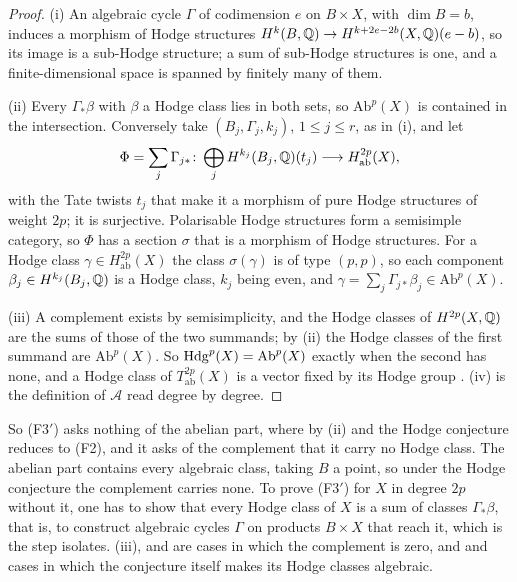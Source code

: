 \begin{proof}
(i) An algebraic cycle $\Gamma$ of codimension $e$ on $B\times X$, with
$\dim B=b$, induces a morphism of Hodge structures
$H^{k}(B,\mathbb{Q})\to H^{k+2e-2b}(X,\mathbb{Q})(e-b)$, so its image is a sub-Hodge
structure; a sum of sub-Hodge structures is one, and a finite-dimensional
space is spanned by finitely many of them.

(ii) Every $\Gamma_{*}\beta$ with $\beta$ a Hodge class lies in both sets, so
$\mathrm{Ab}^{p}(X)$ is contained in the intersection. Conversely take
$(B_{j},\Gamma_{j},k_{j})$, $1\le j\le r$, as in (i), and let
\[
  \Phi=\sum_{j}\Gamma_{j*}\colon
  \bigoplus_{j}H^{k_{j}}(B_{j},\mathbb{Q})(t_{j})\longrightarrow
  H^{2p}_{\mathrm{ab}}(X),
\]
with the Tate twists $t_{j}$ that make it a morphism of pure Hodge structures
of weight $2p$; it is surjective. Polarisable Hodge structures form a
semisimple category, so $\Phi$ has a section $\sigma$ that is a morphism of
Hodge structures. For a Hodge class $\gamma\in H^{2p}_{\mathrm{ab}}(X)$ the
class $\sigma(\gamma)$ is of type $(p,p)$, so each component
$\beta_{j}\in H^{k_{j}}(B_{j},\mathbb{Q})$ is a Hodge class, $k_{j}$ being even, and
$\gamma=\sum_{j}\Gamma_{j*}\beta_{j}\in\mathrm{Ab}^{p}(X)$.

(iii) A complement exists by semisimplicity, and the Hodge classes of
$H^{2p}(X,\mathbb{Q})$ are the sums of those of the two summands; by (ii) the
Hodge classes of the first summand are $\mathrm{Ab}^{p}(X)$. So
$\mathrm{Hdg}^{p}(X)=\mathrm{Ab}^{p}(X)$ exactly when the second has none, and a
Hodge class of $T^{2p}_{\mathrm{ab}}(X)$ is a vector fixed by its Hodge group
\cite[\S3]{Del82}. (iv) is the definition of $\mathcal{A}$ read degree by
degree.
\end{proof}

So \textup{(F3$'$)} asks nothing of the abelian part, where by (ii) and
 the Hodge conjecture reduces to (F2), and it asks of the
complement that it carry no Hodge class. The abelian part contains every
algebraic class, taking $B$ a point, so under the Hodge conjecture the
complement carries none. To prove \textup{(F3$'$)} for $X$ in degree $2p$
without it, one has to show that every Hodge class of $X$ is a sum of
classes $\Gamma_{*}\beta$, that is, to construct algebraic cycles $\Gamma$
on products $B\times X$ that reach it, which is the step
 isolates.
(iii),  and 
are cases in which the complement is zero, and  and
 cases in which the conjecture itself makes its Hodge
classes algebraic.

